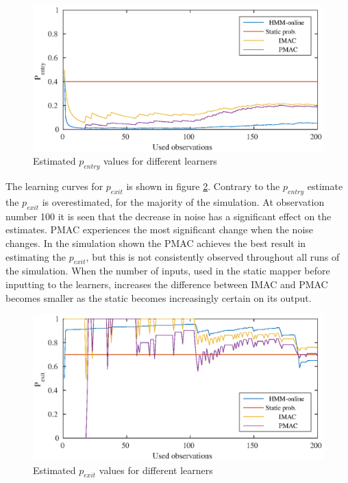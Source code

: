 \begin{figure}[H]
	\centering
	\includegraphics[scale=1]{chapters/mapping_of_dynamic_areas/figures/pmac_imac_hmm_entry}
	\caption{Estimated \(p_{entry}\) values for different learners}
	\label{fig:markow_learning_pmac_comparison_entry}
\end{figure}

The learning curves for \(p_{exit}\) is shown in figure \ref{fig:markow_learning_pmac_comparison_exit}. Contrary to the \(p_{entry}\) estimate the \(p_{exit}\) is overestimated, for the majority of the simulation. At observation number 100 it is seen that the decrease in noise has a significant effect on the estimates. PMAC experiences the most significant change when the noise changes. In the simulation shown the PMAC achieves the best result in estimating the \(p_{exit}\), but this is not consistently observed throughout all runs of the simulation. When the number of inputs, used in the static mapper before inputting to the learners, increases the difference between IMAC and PMAC becomes smaller as the static becomes increasingly certain on its output. 

\begin{figure}[H]
	\centering
	\includegraphics[scale=1]{chapters/mapping_of_dynamic_areas/figures/pmac_imac_hmm_exit}
	\caption{Estimated \(p_{exit}\) values for different learners}
	\label{fig:markow_learning_pmac_comparison_exit}
\end{figure}

